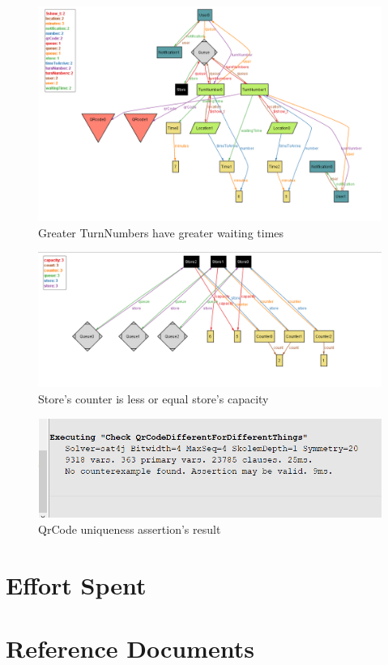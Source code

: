 \documentclass{article}
\begin{document}
\begin{figure}[H]
  \includegraphics[width=\linewidth]{waitingTime}
  \caption{Greater TurnNumbers have greater waiting times}
  
\end{figure}

\begin{figure}[H]
  \includegraphics[width=\linewidth]{storeCapacity}
  \caption{Store's counter is less or equal store's capacity}
  
\end{figure}

\begin{figure}[H]
  \includegraphics[width=\linewidth]{QrCodeAssertion}
  \caption{QrCode uniqueness assertion's result}
  
\end{figure}

\section{Effort Spent}

\section{Reference Documents}
\end{document}
